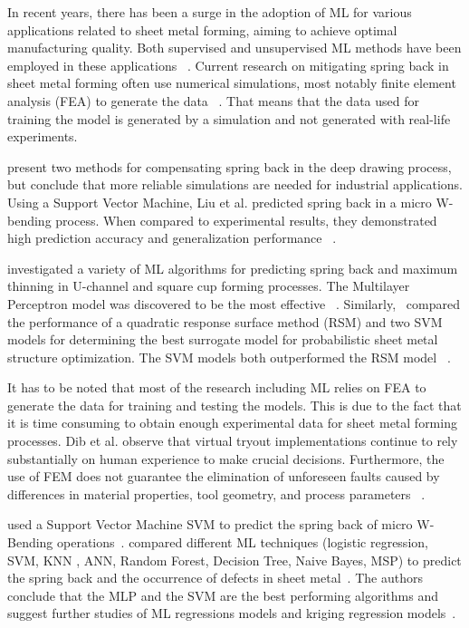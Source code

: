 In recent years, there has been a surge in the adoption of \ac{ML} for various applications related to sheet metal
forming, aiming to achieve optimal manufacturing quality.
Both supervised and unsupervised \ac{ML} methods have been employed in these applications
~\cite[p. 2]{cruz_applicationmachinelearning_2021}.
Current research on mitigating spring back in sheet metal forming often use numerical simulations, most notably
finite element analysis (FEA) to generate the data
~\cite[p. 566]{liu2021deep}.
That means that the data used for training the model is generated by a simulation and not generated with real-life
experiments.

\cite{lingbeek2005development} present two methods for compensating spring back in the deep
drawing process, but conclude that more reliable simulations are needed for industrial applications.
Using a Support Vector Machine, Liu et al. predicted spring back in a micro W-bending process.
When compared to experimental results, they demonstrated high prediction accuracy and generalization performance
~\cite[p. 1]{liu_springbackpredictionforming_2019}.

\cite{dib_singleensembleclassifiers_2020} investigated a variety of \ac{ML} algorithms for predicting spring back and
maximum thinning in
U-channel and square cup forming processes.
The Multilayer Perceptron model was discovered to be the most effective
~\cite[]{dib_singleensembleclassifiers_2020}.
Similarly,~\cite{abdessalem2015probabilistic} compared the performance of a quadratic response surface method (RSM)
and two \ac{SVM} models for determining the best surrogate model for probabilistic sheet metal structure optimization.
The \ac{SVM} models both outperformed the RSM model
~\cite[]{abdessalem2015probabilistic}.

It has to be noted that most of the research including \ac{ML} relies on FEA to generate the data for training and
testing the models.
This is due to the fact that it is time consuming to obtain enough experimental data for
sheet metal forming processes.
Dib et al. observe that virtual tryout implementations continue to rely substantially on human experience to make
crucial decisions.
Furthermore, the use of FEM does not guarantee the elimination of unforeseen faults caused by differences in material
properties, tool geometry, and process parameters
~\cite[p. 2]{dib_singleensembleclassifiers_2020}.

\cite{liu_springbackpredictionforming_2019} used a Support Vector Machine \ac{SVM} to predict the spring back of
micro W-Bending operations~\cite[]{liu_springbackpredictionforming_2019}.
\cite{dib_singleensembleclassifiers_2020} compared different \ac{ML} techniques (logistic regression, SVM, KNN
, ANN, Random Forest, Decision Tree, Naive Bayes, MSP) to predict the spring back and the occurrence of
defects in sheet metal~\cite[p. 1]{dib_singleensembleclassifiers_2020}.
The authors conclude that the MLP and the SVM are the best performing algorithms and
suggest further studies of ML regressions models and kriging regression
models~\cite[p. 13]{dib_singleensembleclassifiers_2020}.

